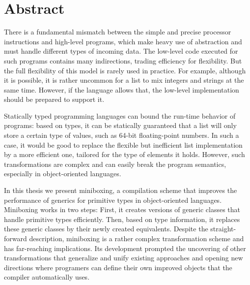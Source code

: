 

\cleardoublepage
\chapter*{Abstract}

\vspace{1em}

There is a fundamental mismatch between the simple and precise processor instructions and high-level programs, which make heavy use of abstraction and must handle different types of incoming data. The low-level code executed for such programs contains many indirections, trading efficiency for flexibility. But the full flexibility of this model is rarely used in practice. For example, although it is possible, it is rather uncommon for a list to mix integers and strings at the same time. However, if the language allows that, the low-level implementation should be prepared to support it.

\vspace{1em}

Statically typed programming languages can bound the run-time behavior of programs: based on types, it can be statically guaranteed that a list will only store a certain type of values, such as 64-bit floating-point numbers. In such a case, it would be good to replace the flexible but inefficient list implementation by a more efficient one, tailored for the type of elements it holds. However, such transformations are complex and can easily break the program semantics, especially in object-oriented languages.

\vspace{1em}

In this thesis we present miniboxing, a compilation scheme that improves the performance of generics for primitive types in object-oriented languages. Miniboxing works in two steps: First, it creates versions of generic classes that handle primitive types efficiently. Then, based on type information, it replaces these generic classes by their newly created equivalents. Despite the straight-forward description, miniboxing is a rather complex transformation scheme and has far-reaching implications. Its development prompted the uncovering of other transformations that generalize and unify existing approaches and opening new directions where programers can define their own improved objects that the compiler automatically uses.

